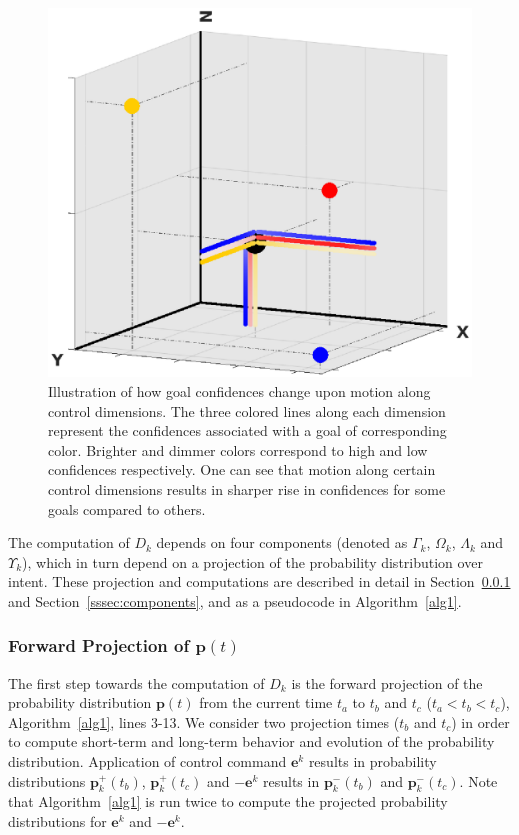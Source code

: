 \documentclass[natbib, twocolumn]{svjour3}          %
\begin{document}
\begin{figure}[h]
	\centering
	\includegraphics[width = 1\hsize]{Fig3.eps}
	\caption{Illustration of how goal confidences change upon motion along control dimensions. The three colored lines along each dimension represent the confidences associated with a goal of corresponding color. Brighter and dimmer colors correspond to high and low confidences respectively. One can see that motion along certain control dimensions results in sharper rise in confidences for some goals compared to others.}
	\label{fig:disamb_motivation}
\end{figure}
The computation of $D_k$ depends on four components (denoted as $\Gamma_k$, $\Omega_k$, $\Lambda_k$ and $\Upsilon_k$), which in turn depend on a projection of the probability distribution over intent. These projection and computations are described in detail in Section~\ref{sssec:projection} and Section~\ref{sssec:components}, and as a pseudocode in Algorithm~\ref{alg1}. 


\subsubsection{Forward Projection of $\boldsymbol{p}(t)$}\label{sssec:projection}
The first step towards the computation of $D_k$ is the forward projection of the probability distribution $\boldsymbol{p}(t)$ from the current time $t_a$ to $t_b$ and $t_c$ ($t_a < t_b < t_c$), Algorithm~\ref{alg1}, lines 3-13. We consider two projection times ($t_b$ and $t_c$) in order to compute short-term and long-term behavior and evolution of the probability distribution. Application of control command $\boldsymbol{e}^k$ results in probability distributions $\boldsymbol{p}^+_k(t_b)$, $\boldsymbol{p}^+_k(t_c)$ and $-\boldsymbol{e}^k$ results in $\boldsymbol{p}^-_k(t_b)$ and $\boldsymbol{p}^-_k(t_c)$. Note that Algorithm~\ref{alg1} is run twice to compute the projected probability distributions for $\boldsymbol{e}^k$ and $-\boldsymbol{e}^k$.
\end{document}
